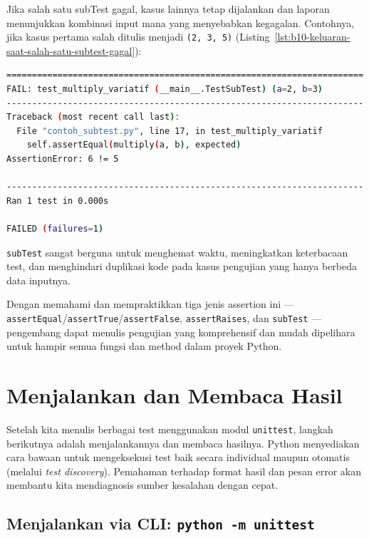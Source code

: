 Jika salah satu subTest gagal, kasus lainnya tetap dijalankan dan laporan menunjukkan kombinasi input mana yang menyebabkan kegagalan. Contohnya, jika kasus pertama salah ditulis menjadi \texttt{(2, 3, 5)} (Listing~\ref{lst:b10-keluaran-saat-salah-satu-subtest-gagal}):

\begin{lstlisting}[language=bash, caption={Keluaran saat salah satu subTest gagal}, label={lst:b10-keluaran-saat-salah-satu-subtest-gagal}]
======================================================================
FAIL: test_multiply_variatif (__main__.TestSubTest) (a=2, b=3)
----------------------------------------------------------------------
Traceback (most recent call last):
  File "contoh_subtest.py", line 17, in test_multiply_variatif
    self.assertEqual(multiply(a, b), expected)
AssertionError: 6 != 5

----------------------------------------------------------------------
Ran 1 test in 0.000s

FAILED (failures=1)
\end{lstlisting}

\texttt{subTest} sangat berguna untuk menghemat waktu, meningkatkan keterbacaan test, dan menghindari duplikasi kode pada kasus pengujian yang hanya berbeda data inputnya.

Dengan memahami dan mempraktikkan tiga jenis assertion ini — \texttt{assertEqual}/\texttt{assertTrue}/\texttt{assertFalse}, \texttt{assertRaises}, dan \texttt{subTest} — pengembang dapat menulis pengujian yang komprehensif dan mudah dipelihara untuk hampir semua fungsi dan method dalam proyek Python.


\section{Menjalankan dan Membaca Hasil}

Setelah kita menulis berbagai test menggunakan modul \texttt{unittest}, langkah berikutnya adalah menjalankannya dan membaca hasilnya.  
Python menyediakan cara bawaan untuk mengeksekusi test baik secara individual maupun otomatis (melalui \textit{test discovery}).  
Pemahaman terhadap format hasil dan pesan error akan membantu kita mendiagnosis sumber kesalahan dengan cepat.

\subsection{Menjalankan via CLI: \texttt{python -m unittest}}

